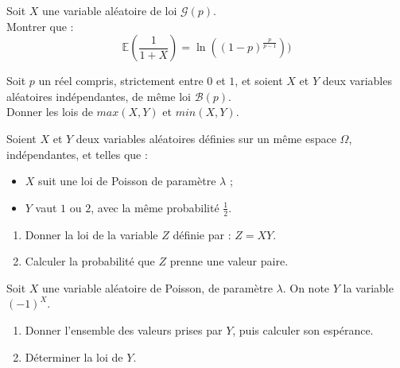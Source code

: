 \begin{exer}
Soit $X$ une variable al\'eatoire de loi $\mathcal{G}(p)$.\\
Montrer que :\[\mathbb{E}\left(\frac{1}{1+X}\right)=\ln((1-p)^{\frac{p}{p-1}}))\]
\end{exer}


\begin{exer}
Soit $p$ un réel compris, strictement entre $0$ et $1$, et soient $X$ et $Y$ deux variables al\'eatoires ind\'ependantes, de m\^eme loi $\mathcal{B}(p)$.\\
Donner les lois de $max(X,Y)$ et $min(X,Y)$.
\end{exer}

\begin{exer}
Soient $X$ et $Y$ deux variables al\'eatoires d\'efinies sur un m\^eme espace $\Omega$, ind\'ependantes, et telles que :
\begin{itemize}
\item $X$ suit une loi de Poisson de param\`etre $\lambda$ ;
\item $Y$ vaut $1$ ou $2$, avec la m\^eme probabilit\'e $\frac{1}{2}$.
\end{itemize}
\begin{enumerate}
\item Donner la loi de la variable $Z$ d\'efinie par : $Z=XY$.
\item Calculer la probabilit\'e que $Z$ prenne une valeur paire.
\end{enumerate}
\end{exer}

\begin{exer}
Soit $X$ une variable al\'eatoire de Poisson, de param\`etre $\lambda$. On note $Y$ la variable $(-1)^X$.
\begin{enumerate}
\item Donner l'ensemble des valeurs prises par $Y$, puis calculer son esp\'erance.
\item D\'eterminer la loi de $Y$.
\end{enumerate}
\end{exer}